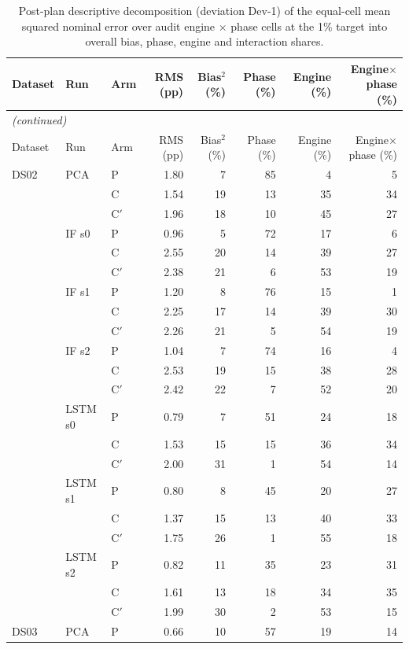 \begin{scriptsize}
\begin{longtable}{lllrrrrr}
\caption{Post-plan descriptive decomposition (deviation Dev-1) of the equal-cell mean squared nominal error over audit engine $\times$ phase cells at the 1\% target into overall bias, phase, engine and interaction shares.}\label{tab:s23_decomposition}\\
\toprule
Dataset & Run & Arm & RMS (pp) & Bias$^2$ (\%) & Phase (\%) & Engine (\%) & Engine$\times$phase (\%) \\
\midrule
\endfirsthead
\multicolumn{8}{l}{\emph{(continued)}}\\
\toprule
Dataset & Run & Arm & RMS (pp) & Bias$^2$ (\%) & Phase (\%) & Engine (\%) & Engine$\times$phase (\%) \\
\midrule
\endhead
\bottomrule
\endfoot
DS02 & PCA & P & 1.80 & 7 & 85 & 4 & 5 \\
 &  & C & 1.54 & 19 & 13 & 35 & 34 \\
 &  & C$'$ & 1.96 & 18 & 10 & 45 & 27 \\
 & IF s0 & P & 0.96 & 5 & 72 & 17 & 6 \\
 &  & C & 2.55 & 20 & 14 & 39 & 27 \\
 &  & C$'$ & 2.38 & 21 & 6 & 53 & 19 \\
 & IF s1 & P & 1.20 & 8 & 76 & 15 & 1 \\
 &  & C & 2.25 & 17 & 14 & 39 & 30 \\
 &  & C$'$ & 2.26 & 21 & 5 & 54 & 19 \\
 & IF s2 & P & 1.04 & 7 & 74 & 16 & 4 \\
 &  & C & 2.53 & 19 & 15 & 38 & 28 \\
 &  & C$'$ & 2.42 & 22 & 7 & 52 & 20 \\
 & LSTM s0 & P & 0.79 & 7 & 51 & 24 & 18 \\
 &  & C & 1.53 & 15 & 15 & 36 & 34 \\
 &  & C$'$ & 2.00 & 31 & 1 & 54 & 14 \\
 & LSTM s1 & P & 0.80 & 8 & 45 & 20 & 27 \\
 &  & C & 1.37 & 15 & 13 & 40 & 33 \\
 &  & C$'$ & 1.75 & 26 & 1 & 55 & 18 \\
 & LSTM s2 & P & 0.82 & 11 & 35 & 23 & 31 \\
 &  & C & 1.61 & 13 & 18 & 34 & 35 \\
 &  & C$'$ & 1.99 & 30 & 2 & 53 & 15 \\
\midrule
DS03 & PCA & P & 0.66 & 10 & 57 & 19 & 14 \\

\end{longtable}
\end{scriptsize}
